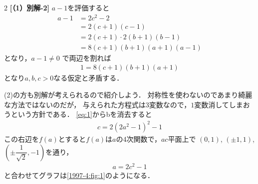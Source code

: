 \documentclass[../../main.tex]{subfiles}
\begin{document}
\begin{multicols}{2}
  \textbf{[（1）別解-2]}
  $a-1$を評価すると
  \begin{align}
    a-1
    & = 2c^2-2                   \\
    & = 2(c+1)(c-1)              \\
    & = 2(c+1) \cdot 2(b+1)(b-1) \\
    & = 8(c+1)(b+1)(a+1)(a-1)
  \end{align}
  となり，$a-1 \ne 0$ で両辺を割れば
  \begin{align}
    1 = 8(c+1)(b+1)(a+1)
  \end{align}
  となり$a,b,c>0$なる仮定と矛盾する．

  (2)の方も別解が考えられるので紹介しよう．
  対称性を使わないのであまり綺麗な方法ではないのだが，
  与えられた方程式は$3$変数なので，$1$変数消してしまおうという方針である．
  \cref{eq:1}からbを消去すると
  \begin{align}
    c = 2(2a^2-1)^2-1
  \end{align}
  この右辺を$f(a)$とすると$f(a)$は$a$の4次関数で，$ac$平面上で
  $(0,1)$, $(\pm 1,1)$, $(\pm \dfrac{1}{\sqrt{2}}, -1)$を通り，
  \begin{align}
    a = 2c^2-1
  \end{align}
  と合わせてグラフは\cref{1997-4:fig:1}のようになる．

  \begin{figure}[H]
\end{figure}
\end{multicols}
\end{document}

